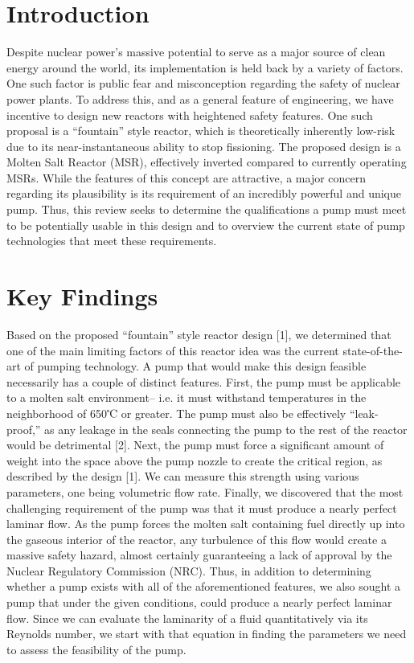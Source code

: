\documentclass[11pt]{article}
\begin{document}
\section{Introduction}

Despite nuclear power’s massive potential to serve as a major source of clean energy around the world, its implementation is held back by a variety of factors. One such factor is public fear and misconception regarding the safety of nuclear power plants. To address this, and as a general feature of engineering, we have incentive to design new reactors with heightened safety features. One such proposal is a “fountain” style reactor, which is theoretically inherently low-risk due to its near-instantaneous ability to stop fissioning. The proposed design is a Molten Salt Reactor (MSR), effectively inverted compared to currently operating MSRs. While the features of this concept are attractive, a major concern regarding its plausibility is its requirement of an incredibly powerful and unique pump. Thus, this review seeks to determine the qualifications a pump must meet to be potentially usable in this design and to overview the current state of pump technologies that meet these requirements.


\section{Key Findings}

Based on the proposed “fountain” style reactor design [1], we determined that one of the main limiting factors of this reactor idea was the current state-of-the-art of pumping technology. A pump that would make this design feasible necessarily has a couple of distinct features. First, the pump must be applicable to a molten salt environment-- i.e. it must withstand temperatures in the neighborhood of 650℃ or greater. The pump must also be effectively “leak-proof,” as any leakage in the seals connecting the pump to the rest of the reactor would be detrimental [2]. Next, the pump must force a significant amount of weight into the space above the pump nozzle to create the critical region, as described by the design [1]. We can measure this strength using various parameters, one being volumetric flow rate. Finally, we discovered that the most challenging requirement of the pump was that it must produce a nearly perfect laminar flow. As the pump forces the molten salt containing fuel directly up into the gaseous interior of the reactor, any turbulence of this flow would create a massive safety hazard, almost certainly guaranteeing a lack of approval by the Nuclear Regulatory Commission (NRC). Thus, in addition to determining whether a pump exists with all of the aforementioned features, we also sought a pump that under the given conditions, could produce a nearly perfect laminar flow. Since we can evaluate the laminarity of a fluid quantitatively via its Reynolds number, we start with that equation in finding the parameters we need to assess the feasibility of the pump.
\end{document}
